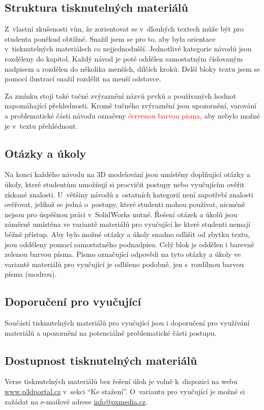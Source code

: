 \subsection{Struktura tisknutelných materiálů}
Z~vlastní zkušenosti vím, že zorientovat se v~dlouhých textech může být pro studenta poněkud obtížné.
Snažil jsem se pro to, aby byla orientace v~tisknutelných materiálech co nejjednodušší.
Jednotlivé kategorie návodů jsou rozděleny do kapitol.
Každý návod je poté oddělen samostatným číslovaným nadpisem a rozdělen do několika menších, dílčích kroků.
Delší bloky textu jsem se pomocí ilustrací snažil rozdělit na menší odstavce.

Za zmínku stojí také tučné zvýraznění názvů prvků a používaných hodnot napomáhající přehlednosti.
Kromě tučného zvýraznění jsou upozornění, varování a problematické části návodu označeny \textcolor{red}{červenou barvou písma}, aby nebylo možné je v~textu přehlédnout.

\subsection{Otázky a úkoly}
Na konci každého návodu na 3D modelování jsou umístěny doplňující otázky a úkoly, které studentům umožňují si procvičit postupy nebo vyučujícím ověřit získané znalosti.
U~většiny návodů z~ostatních kategorií není zapotřebí znalosti ověřovat, jelikož se jedná o~postupy, které studenti mohou používat, nicméně nejsou pro úspěšnou práci v~SolidWorks nutné.
Řešení otázek a úkolů jsou záměrně umístěna ve variantě materiálů pro vyučující ke které studenti nemají běžně přístup.
Aby bylo možné otázky a úkoly snadno odlišit od zbytku textu, jsou odděleny pomocí samostatného podnadpisu.
Celý blok je oddělen i barevně \textcolor{p3dgreen}{zelenou barvou písma}.
Písmo označující odpovědi na tyto otázky a úkoly ve variantě materiálů pro vyučující je odlišeno podobně, jen s~rozdílnou barvou písma \textcolor{p3dblue}{(modrou)}.

\subsection*{Doporučení pro vyučující}
Součástí tisknutelných materiálů pro vyučující jsou i doporučení pro využívání materiálů a upozornění na potenciálně problematické části postupu.

\subsection{Dostupnost tisknutelných materiálů}
Verze tisknutelných materiálů bez řešení úloh je volně k~dispozici na webu \href{https://www.p3dportal.cz}{www.p3dportal.cz} v~sekci \enquote{Ke stažení}.
O~variantu pro vyučující je možné si zažádat na e-mailové adrese \href{mailto:info@pxmedia.cz}{info@pxmedia.cz}.

